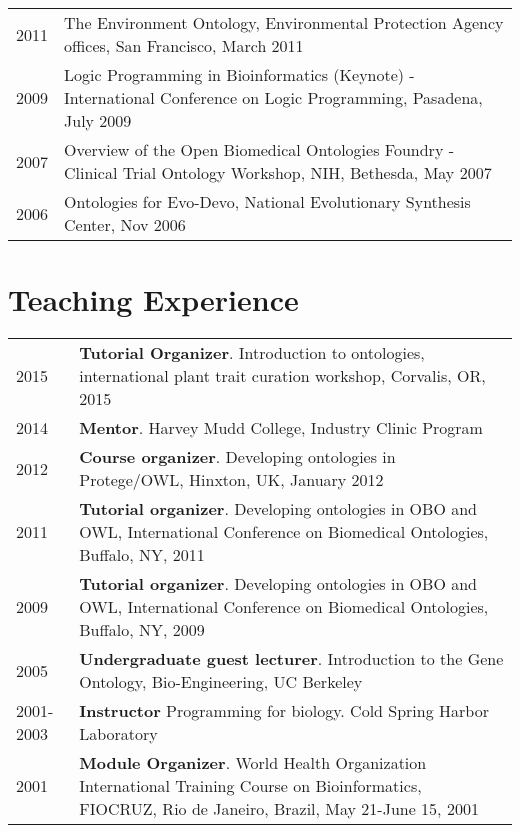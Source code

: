 \documentclass[11pt,fullpage]{article}
\begin{document}
\begin{longtable}{p{0.5in}|p{5.5in}}
 2011 & The Environment Ontology, Environmental Protection Agency offices, San Francisco, March 2011 \\

 2009 & Logic Programming in Bioinformatics (Keynote) - International
 Conference on Logic Programming, Pasadena, July 2009 \\

 2007 & Overview of the Open Biomedical Ontologies Foundry - Clinical Trial Ontology Workshop, NIH, Bethesda, May 2007 \\

 2006 & Ontologies for Evo-Devo, National Evolutionary Synthesis Center, Nov 2006 \\


\end{longtable}




\section*{Teaching Experience}

\begin{longtable}{p{0.5in}|p{5.5in}}
  2015 &  \textbf{Tutorial Organizer}. Introduction to ontologies, international plant trait curation workshop, Corvalis, OR, 2015  \\
  2014 &  \textbf{Mentor}. Harvey Mudd College, Industry Clinic Program \\
  2012 &  \textbf{Course organizer}. Developing ontologies in Protege/OWL, Hinxton, UK, January 2012 \\
  2011 &  \textbf{Tutorial organizer}. Developing ontologies in OBO and OWL, International Conference on Biomedical Ontologies, Buffalo, NY, 2011 \\
  2009 &  \textbf{Tutorial organizer}. Developing ontologies in OBO and OWL, International Conference on Biomedical Ontologies, Buffalo, NY, 2009 \\
  2005 &  \textbf{Undergraduate guest lecturer}. Introduction to the Gene Ontology, Bio-Engineering, UC Berkeley \\
  2001-2003 &  \textbf{Instructor} Programming for biology. Cold Spring Harbor Laboratory\\
  2001 &  \textbf{Module Organizer}. World Health Organization International Training Course on Bioinformatics, FIOCRUZ, Rio de Janeiro, Brazil, May 21-June 15, 2001 \\
\end{longtable}
\end{document}
